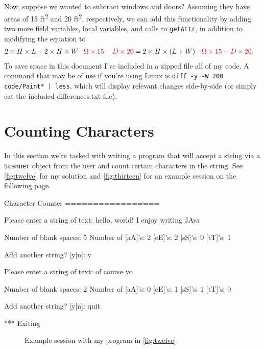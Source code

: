 \documentclass[leqno, 11pt]{article}
\begin{document}
Now, suppose we wanted to subtract windows and doors? Assuming they have areas of 15 \si{ft^{2}} and 20 \si{ft^{2}}, respectively, we can add this functionality by adding two more field variables, local variables, and calls to \texttt{getAttr}, in addition to modifying the equation to
\begin{align}
  2\times H\times L + 2\times H\times W \color{red}{- \Omega\times 15 - D\times 20}&=2\times H\times\left(L + W\right)\color{red}{- \Omega\times 15 - D\times 20}.\notag
\end{align}
To save space in this document I've included in a zipped file all of my code. A command that may be of use if you're using Linux is \texttt{diff -y -W 200 code/Paint* | less}, which  will display relevant changes side-by-side (or simply cat the included differences.txt file).
\section*{Counting Characters}
In this section we're tasked with writing a program that will accept a string via a \texttt{Scanner} object from the user and count certain characters in the string. See \autoref{fig:twelve} for my solution and \autoref{fig:thirteen} for an example session on the following page.
\begin{verbbox}[\mbox{}\scriptsize]
Character Counter
=================

Please enter a string of text: hello, world! I enjoy writing JAva

Number of blank spaces: 5
Number of [aA]'s: 2
          [eE]'s: 2
          [sS]'s: 0
          [tT]'s: 1

Add another string? [y|n]: y

Please enter a string of text: of course yo

Number of blank spaces: 2
Number of [aA]'s: 0
          [eE]'s: 1
          [sS]'s: 1
          [tT]'s: 0

Add another string? [y|n]: quit

*** Exiting
\end{verbbox}
\begin{figure}[t!]
  \centering
  \theverbbox
  \caption{Example session with my program in \autoref{fig:twelve}.}
  \label{fig:thirteen}
\end{figure}
\end{document}
